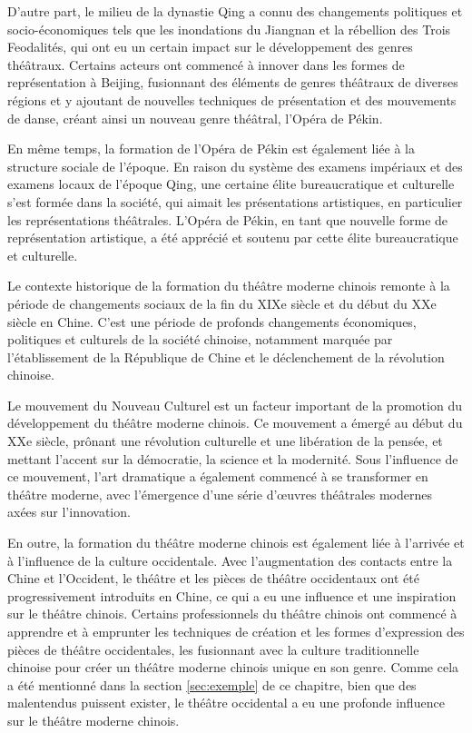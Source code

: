 \documentclass[UTF8,a4paper,12pt]{ctexart}
\numberwithin{equation}{section}
\newcommand{\mycite}[1]{\cite{#1}}
\begin{document}
D'autre part, le milieu de la dynastie Qing a connu des changements politiques et socio-économiques tels que les inondations du Jiangnan et la rébellion des Trois Feodalités, qui ont eu un certain impact sur le développement des genres théâtraux. Certains acteurs ont commencé à innover dans les formes de représentation à Beijing, fusionnant des éléments de genres théâtraux de diverses régions et y ajoutant de nouvelles techniques de présentation et des mouvements de danse, créant ainsi un nouveau genre théâtral, l'Opéra de Pékin.

En même temps, la formation de l'Opéra de Pékin est également liée à la structure sociale de l'époque. En raison du système des examens impériaux et des examens locaux de l'époque Qing, une certaine élite bureaucratique et culturelle s'est formée dans la société, qui aimait les présentations artistiques, en particulier les représentations théâtrales. L'Opéra de Pékin, en tant que nouvelle forme de représentation artistique, a été apprécié et soutenu par cette élite bureaucratique et culturelle.


Le contexte historique de la formation du théâtre moderne chinois remonte à la période de changements sociaux de la fin du XIXe siècle et du début du XXe siècle en Chine. C'est une période de profonds changements économiques, politiques et culturels de la société chinoise, notamment marquée par l'établissement de la République de Chine et le déclenchement de la révolution chinoise.

Le mouvement du Nouveau Culturel est un facteur important de la promotion du développement du théâtre moderne chinois. Ce mouvement a émergé au début du XXe siècle, prônant une révolution culturelle et une libération de la pensée, et mettant l'accent sur la démocratie, la science et la modernité. Sous l'influence de ce mouvement, l'art dramatique a également commencé à se transformer en théâtre moderne, avec l'émergence d'une série d'œuvres théâtrales modernes axées sur l'innovation\mycite{16}.

En outre, la formation du théâtre moderne chinois est également liée à l'arrivée et à l'influence de la culture occidentale. Avec l'augmentation des contacts entre la Chine et l'Occident, le théâtre et les pièces de théâtre occidentaux ont été progressivement introduits en Chine, ce qui a eu une influence et une inspiration sur le théâtre chinois. Certains professionnels du théâtre chinois ont commencé à apprendre et à emprunter les techniques de création et les formes d'expression des pièces de théâtre occidentales, les fusionnant avec la culture traditionnelle chinoise pour créer un théâtre moderne chinois unique en son genre. Comme cela a été mentionné dans la section \ref{sec:exemple} de ce chapitre, bien que des malentendus puissent exister, le théâtre occidental a eu une profonde influence sur le théâtre moderne chinois.
\end{document}
